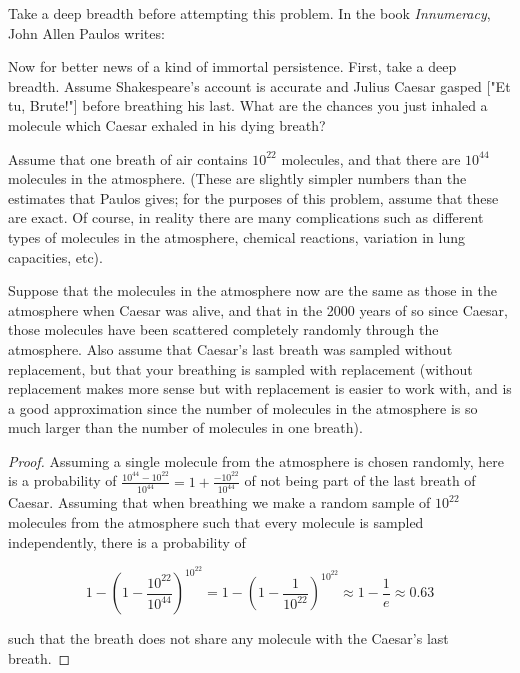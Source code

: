 \begin{exercise}{57}
    Take a deep breadth before attempting this problem. In the book \textit{Innumeracy}, John Allen Paulos writes:

    Now for better news of a kind of immortal persistence. First, take a deep breadth. Assume Shakespeare's account is accurate and Julius Caesar gasped ["Et tu, Brute!"] before breathing his last. What are the chances you just inhaled a molecule which Caesar exhaled in his dying breath?

    Assume that one breath of air contains $10^{22}$ molecules, and that there are $10^{44}$ molecules in the atmosphere. (These are slightly simpler numbers than the estimates that Paulos gives; for the purposes of this problem, assume that these are exact. Of course, in reality there are many complications such as different types of molecules in the atmosphere, chemical reactions, variation in lung capacities, etc).

    Suppose that the molecules in the atmosphere now are the same as those in the atmosphere when Caesar was alive, and that in the 2000 years of so since Caesar, those molecules have been scattered completely randomly through the atmosphere. Also assume that Caesar's last breath was sampled without replacement, but that your breathing is sampled with replacement (without replacement makes more sense but with replacement is easier to work with, and is a good approximation since the number of molecules in the atmosphere is so much larger than the number of molecules in one breath).
\end{exercise}

\begin{proof}
    Assuming a single molecule from the atmosphere is chosen randomly, here is a probability of $\frac{10^{44}-10^{22}}{10^{44}} = 1 + \frac{-10^{22}}{10^{44}}$ of not being part of the last breath of Caesar. Assuming that when breathing we make a random sample of $10^{22}$ molecules from the atmosphere such that every molecule is sampled independently, there is a probability of 
    
    $$1-\left(1 - \frac{10^{22}}{10^{44}}\right)^{10^{22}} = 1-\left(1 - \frac{1}{10^{22}}\right)^{10^{22}} \approx 1-\frac{1}{e} \approx 0.63$$
    
    such that the breath does not share any molecule with the Caesar's last breath.
\end{proof}

